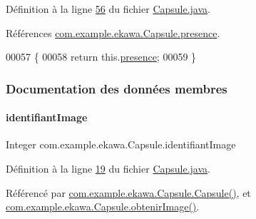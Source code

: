 Définition à la ligne \hyperlink{_capsule_8java_source_l00056}{56} du fichier \hyperlink{_capsule_8java_source}{Capsule.\+java}.



Références \hyperlink{_capsule_8java_source_l00020}{com.\+example.\+ekawa.\+Capsule.\+presence}.


\begin{DoxyCode}
00057     \{
00058         \textcolor{keywordflow}{return} this.\hyperlink{classcom_1_1example_1_1ekawa_1_1_capsule_a351ef1f4b4258f4651d24b206fc38a94}{presence};
00059     \}
\end{DoxyCode}


\subsubsection{Documentation des données membres}
\mbox{\label{classcom_1_1example_1_1ekawa_1_1_capsule_a05fa50e416ea3a48d6b8dab73174c9d0}} 
\paragraph{\texorpdfstring{identifiant\+Image}{identifiantImage}}
{\footnotesize\ttfamily Integer com.\+example.\+ekawa.\+Capsule.\+identifiant\+Image\hspace{0.3cm}{\ttfamily [private]}}



Définition à la ligne \hyperlink{_capsule_8java_source_l00019}{19} du fichier \hyperlink{_capsule_8java_source}{Capsule.\+java}.



Référencé par \hyperlink{_capsule_8java_source_l00027}{com.\+example.\+ekawa.\+Capsule.\+Capsule()}, et \hyperlink{_capsule_8java_source_l00047}{com.\+example.\+ekawa.\+Capsule.\+obtenir\+Image()}.

\mbox{\label{classcom_1_1example_1_1ekawa_1_1_capsule_a936a082e9bcfdda4bb8fbffd33665cb0}} 
